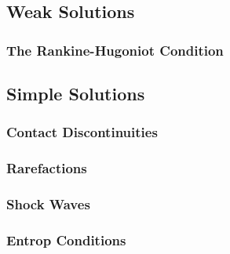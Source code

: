 \documentclass[
  fourColumns,
  landscape
]{formularyETH/formularyETH}
\begin{document}
    \subsection{Weak Solutions}\label{subsec:weak_solutions}
      
      \subsubsection{The Rankine-Hugoniot Condition}
      
    \subsection{Simple Solutions}\label{subsec:name}
      
      \subsubsection{Contact Discontinuities}\label{subsubsec:contact_discontinuities}
        
      \subsubsection{Rarefactions}\label{subsubsec:rarefactions}
        
      \subsubsection{Shock Waves}\label{subsubsec:shock_waves}
        
      \subsubsection{Entrop Conditions}\label{subsubsec:entrop_conditions}
        
        \label{subsubsubsec:lax_entropy_condition}
        
\end{document}

